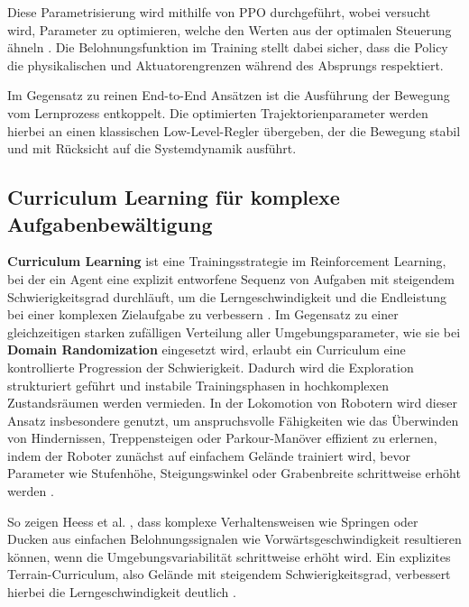 Diese Parametrisierung wird mithilfe von PPO durchgeführt, wobei versucht wird, Parameter zu optimieren, welche den Werten aus der optimalen Steuerung ähneln \cite{bussolaGuidedReinforcementLearning2025}. Die Belohnungsfunktion im Training stellt dabei sicher, dass die Policy die physikalischen und Aktuatorengrenzen während des Absprungs respektiert.

Im Gegensatz zu reinen End-to-End Ansätzen ist die Ausführung der Bewegung vom Lernprozess entkoppelt. Die optimierten Trajektorienparameter werden hierbei an einen klassischen Low-Level-Regler übergeben, der die Bewegung stabil und mit Rücksicht auf die Systemdynamik ausführt.

\subsection{Curriculum Learning für komplexe Aufgabenbewältigung}
\textbf{Curriculum Learning} ist eine Trainingsstrategie im Reinforcement Learning, bei der ein Agent eine explizit entworfene Sequenz von Aufgaben mit steigendem Schwierigkeitsgrad durchläuft, um die Lerngeschwindigkeit und die Endleistung bei einer komplexen Zielaufgabe zu verbessern \cite{francois-lavetIntroductionDeepReinforcement2018, arulkumaranDRL2017}. \newline
Im Gegensatz zu einer gleichzeitigen starken zufälligen Verteilung aller Umgebungsparameter, wie sie bei \textbf{Domain Randomization} eingesetzt wird, erlaubt ein Curriculum eine kontrollierte Progression der Schwierigkeit. Dadurch wird die Exploration strukturiert geführt und instabile Trainingsphasen in hochkomplexen Zustandsräumen werden vermieden. In der Lokomotion von Robotern wird dieser Ansatz insbesondere genutzt, um anspruchsvolle Fähigkeiten wie das Überwinden von Hindernissen, Treppensteigen oder Parkour-Manöver effizient zu erlernen, indem der Roboter zunächst auf einfachem Gelände trainiert wird, bevor Parameter wie Stufenhöhe, Steigungswinkel oder Grabenbreite schrittweise erhöht werden \cite{heessEmergenceLocomotionBehaviours2017, rudin2022learningwalkminutesusing, hoellerANYmalParkourLearning2023, jinResilientLeggedLocal2023}.

So zeigen Heess et al. \cite{heessEmergenceLocomotionBehaviours2017}, dass komplexe Verhaltensweisen wie Springen oder Ducken aus einfachen Belohnungssignalen wie Vorwärtsgeschwindigkeit resultieren können, wenn die Umgebungsvariabilität schrittweise erhöht wird. Ein explizites Terrain-Curriculum, also Gelände mit steigendem Schwierigkeitsgrad, verbessert hierbei die Lerngeschwindigkeit deutlich \cite{heessEmergenceLocomotionBehaviours2017}.

